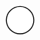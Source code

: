 \documentclass[10pt]{article}
\theoremstyle{plain}
\theoremstyle{remark}
\begin{document}
\[\begin{pgfpicture}
\begin{pgfscope}
\pgfpathcurveto{\pgfqpoint{2.427977in}{3.204376in}}{\pgfqpoint{2.378012in}{3.183680in}}{\pgfqpoint{2.341178in}{3.146846in}}%
\pgfpathcurveto{\pgfqpoint{2.304345in}{3.110012in}}{\pgfqpoint{2.283649in}{3.060048in}}{\pgfqpoint{2.283649in}{3.007957in}}%
\pgfpathcurveto{\pgfqpoint{2.283649in}{2.955866in}}{\pgfqpoint{2.304345in}{2.905902in}}{\pgfqpoint{2.341178in}{2.869068in}}%
\pgfpathcurveto{\pgfqpoint{2.378012in}{2.832234in}}{\pgfqpoint{2.427977in}{2.811538in}}{\pgfqpoint{2.480067in}{2.811538in}}%
\pgfpathclose%
\pgfusepath{stroke,fill}%
\end{pgfscope}%
\begin{pgfscope}%
\pgfsetbuttcap%
\pgfsetroundjoin%
\definecolor{currentfill}{rgb}{1.000000,1.000000,1.000000}%
\pgfsetfillcolor{currentfill}%
\pgfsetlinewidth{1.003750pt}%
\definecolor{currentstroke}{rgb}{0.000000,0.000000,0.000000}%
\pgfsetstrokecolor{currentstroke}%
\pgfsetdash{}{0pt}%
\pgfpathmoveto{\pgfqpoint{1.947045in}{0.100000in}}%
\pgfpathcurveto{\pgfqpoint{1.999136in}{0.100000in}}{\pgfqpoint{2.049100in}{0.120696in}}{\pgfqpoint{2.085934in}{0.157530in}}%
\pgfpathcurveto{\pgfqpoint{2.122767in}{0.194363in}}{\pgfqpoint{2.143463in}{0.244328in}}{\pgfqpoint{2.143463in}{0.296419in}}%
\pgfpathcurveto{\pgfqpoint{2.143463in}{0.348509in}}{\pgfqpoint{2.122767in}{0.398474in}}{\pgfqpoint{2.085934in}{0.435307in}}%
\pgfpathcurveto{\pgfqpoint{2.049100in}{0.472141in}}{\pgfqpoint{1.999136in}{0.492837in}}{\pgfqpoint{1.947045in}{0.492837in}}%
\pgfpathcurveto{\pgfqpoint{1.894954in}{0.492837in}}{\pgfqpoint{1.844990in}{0.472141in}}{\pgfqpoint{1.808156in}{0.435307in}}%
\pgfpathcurveto{\pgfqpoint{1.771322in}{0.398474in}}{\pgfqpoint{1.750626in}{0.348509in}}{\pgfqpoint{1.750626in}{0.296419in}}%
\pgfpathcurveto{\pgfqpoint{1.750626in}{0.244328in}}{\pgfqpoint{1.771322in}{0.194363in}}{\pgfqpoint{1.808156in}{0.157530in}}%
\pgfpathcurveto{\pgfqpoint{1.844990in}{0.120696in}}{\pgfqpoint{1.894954in}{0.100000in}}{\pgfqpoint{1.947045in}{0.100000in}}%
\pgfpathclose%
\pgfusepath{stroke,fill}%
\end{pgfscope}%
\begin{pgfscope}%
\pgfsetbuttcap%
\pgfsetroundjoin%
\definecolor{currentfill}{rgb}{1.000000,1.000000,1.000000}%
\pgfsetfillcolor{currentfill}%
\pgfsetlinewidth{1.003750pt}%
\definecolor{currentstroke}{rgb}{0.000000,0.000000,0.000000}%
\pgfsetstrokecolor{currentstroke}%
\pgfsetdash{}{0pt}%
\pgfpathmoveto{\pgfqpoint{3.565783in}{2.811538in}}%
\pgfpathcurveto{\pgfqpoint{3.617873in}{2.811538in}}{\pgfqpoint{3.667838in}{2.832234in}}{\pgfqpoint{3.704671in}{2.869068in}}%
\pgfpathcurveto{\pgfqpoint{3.741505in}{2.905902in}}{\pgfqpoint{3.762201in}{2.955866in}}{\pgfqpoint{3.762201in}{3.007957in}}%

\end{pgfscope}
\end{pgfpicture}\]
\end{document}
